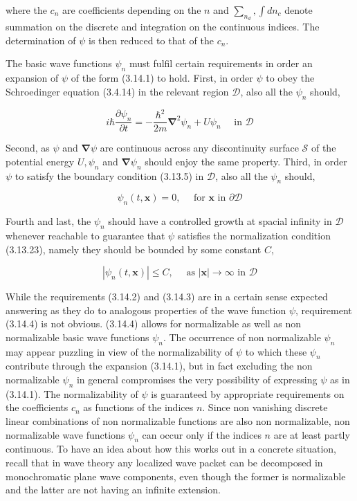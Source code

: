 \documentclass{article}
\begin{document}
where the $c_{n}$ are coefficients depending on the $n$ and $\sum_{n_{d}}, \int d n_{c}$ denote summation on the discrete and integration on the continuous indices. The determination of $\psi$ is then reduced to that of the $c_{n}$.

The basic wave functions $\psi_{n}$ must fulfil certain requirements in order an expansion of $\psi$ of the form (3.14.1) to hold. First, in order $\psi$ to obey the Schroedinger equation (3.4.14) in the relevant region $\mathcal{D}$, also all the $\psi_{n}$ should,
 
\begin{equation*}
i \hbar \frac{\partial \psi_{n}}{\partial t}=-\frac{\hbar^{2}}{2 m} \boldsymbol{\nabla}^{2} \psi_{n}+U \psi_{n} \quad \text { in } \mathcal{D} \tag{3.14.2}
\end{equation*}
 

Second, as $\psi$ and $\boldsymbol{\nabla} \psi$ are continuous across any discontinuity surface $\mathcal{S}$ of the potential energy $U, \psi_{n}$ and $\boldsymbol{\nabla} \psi_{n}$ should enjoy the same property. Third, in order $\psi$ to satisfy the boundary condition (3.13.5) in $\mathcal{D}$, also all the $\psi_{n}$ should,
 
\begin{equation*}
\psi_{n}(t, \boldsymbol{x})=0, \quad \text { for } \boldsymbol{x} \text { in } \partial \mathcal{D} \tag{3.14.3}
\end{equation*}
 

Fourth and last, the $\psi_{n}$ should have a controlled growth at spacial infinity in $\mathcal{D}$ whenever reachable to guarantee that $\psi$ satisfies the normalization condition (3.13.23), namely they should be bounded by some constant $C$,
 
\begin{equation*}
\left|\psi_{n}(t, \boldsymbol{x})\right| \leq C, \quad \text { as }|\boldsymbol{x}| \rightarrow \infty \text { in } \mathcal{D} \tag{3.14.4}
\end{equation*}
 

While the requirements (3.14.2) and (3.14.3) are in a certain sense expected answering as they do to analogous properties of the wave function $\psi$, requirement (3.14.4) is not obvious. (3.14.4) allows for normalizable as well as non normalizable basic wave functions $\psi_{n}$. The occurrence of non normalizable $\psi_{n}$ may appear puzzling in view of the normalizability of $\psi$ to which these $\psi_{n}$ contribute through the expansion (3.14.1), but in fact excluding the non normalizable $\psi_{n}$ in general compromises the very possibility of expressing $\psi$ as in (3.14.1). The normalizability of $\psi$ is guaranteed by appropriate requirements on the coefficients $c_{n}$ as functions of the indices $n$. Since non vanishing discrete linear combinations of non normalizable functions are also non normalizable, non normalizable wave functions $\psi_{n}$ can occur only if the indices $n$ are at least partly continuous. To have an idea about how this works out in a concrete situation, recall that in wave theory any localized wave packet can be decomposed in monochromatic plane wave components, even though the former is normalizable and the latter are not having an infinite extension.
\end{document}
